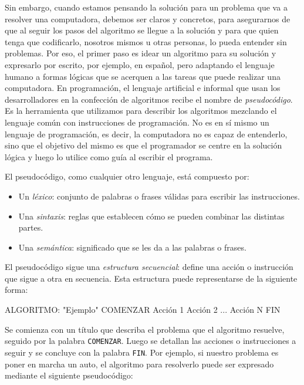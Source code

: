 \documentclass[
]{book}
\newenvironment{Shaded}{\begin{snugshade}}{\end{snugshade}}
\newcommand{\NormalTok}[1]{#1}
\providecommand{\tightlist}{%
  \setlength{\itemsep}{0pt}\setlength{\parskip}{0pt}}
\begin{document}
Sin embargo, cuando estamos pensando la solución para un problema que va a resolver una computadora, debemos ser claros y concretos, para asegurarnos de que al seguir los pasos del algoritmo se llegue a la solución y para que quien tenga que codificarlo, nosotros mismos u otras personas, lo pueda entender sin problemas. Por eso, el primer paso es idear un algoritmo para su solución y expresarlo por escrito, por ejemplo, en español, pero adaptando el lenguaje humano a formas lógicas que se acerquen a las tareas que puede realizar una computadora. En programación, el lenguaje artificial e informal que usan los desarrolladores en la confección de algoritmos recibe el nombre de \emph{pseudocódigo}. Es la herramienta que utilizamos para describir los algoritmos mezclando el lenguaje común con instrucciones de programación. No es en sí mismo un lenguaje de programación, es decir, la computadora no es capaz de entenderlo, sino que el objetivo del mismo es que el programador se centre en la solución lógica y luego lo utilice como guía al escribir el programa.

El pseudocódigo, como cualquier otro lenguaje, está compuesto por:

\begin{itemize}
\tightlist
\item
  Un \emph{léxico}: conjunto de palabras o frases válidas para escribir las instrucciones.
\item
  Una \emph{sintaxis}: reglas que establecen cómo se pueden combinar las distintas partes.
\item
  Una \emph{semántica}: significado que se les da a las palabras o frases.
\end{itemize}

El pseudocódigo sigue una \emph{estructura secuencial}: define una acción o instrucción que sigue a otra en secuencia. Esta estructura puede representarse de la siguiente forma:

\begin{Shaded}
\begin{Highlighting}[]
\NormalTok{ALGORITMO: "Ejemplo"}
\NormalTok{COMENZAR}
\NormalTok{    Acción 1}
\NormalTok{    Acción 2}
\NormalTok{    ...}
\NormalTok{    Acción N}
\NormalTok{FIN}
\end{Highlighting}
\end{Shaded}

Se comienza con un título que describa el problema que el algoritmo resuelve, seguido por la palabra \texttt{COMENZAR}. Luego se detallan las acciones o instrucciones a seguir y se concluye con la palabra \texttt{FIN}. Por ejemplo, si nuestro problema es poner en marcha un auto, el algoritmo para resolverlo puede ser expresado mediante el siguiente pseudocódigo:
\end{document}
